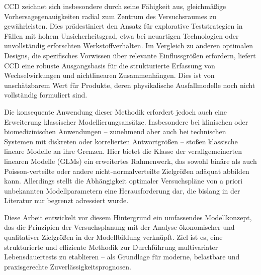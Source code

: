CCD zeichnet sich insbesondere durch seine Fähigkeit aus, gleichmäßige Vorhersagegenauigkeiten radial zum Zentrum des Versuchsraumes zu gewährleisten. Dies prädestiniert den Ansatz für explorative Teststrategien in Fällen mit hohem Unsicherheitsgrad, etwa bei neuartigen Technologien oder unvollständig erforschten Werkstoffverhalten. Im Vergleich zu anderen optimalen Designs, die spezifisches Vorwissen über relevante Einflussgrößen erfordern, liefert CCD eine robuste Ausgangsbasis für die strukturierte Erfassung von Wechselwirkungen und nichtlinearen Zusammenhängen. Dies ist von unschätzbarem Wert für Produkte, deren physikalische Ausfallmodelle noch nicht vollständig formuliert sind.

Die konsequente Anwendung dieser Methodik erfordert jedoch auch eine Erweiterung klassischer Modellierungsansätze. Insbesondere bei klinischen oder biomedizinischen Anwendungen – zunehmend aber auch bei technischen Systemen mit diskreten oder korrelierten Antwortgrößen – stoßen klassische lineare Modelle an ihre Grenzen. Hier bietet die Klasse der verallgemeinerten linearen Modelle (GLMs) ein erweitertes Rahmenwerk, das sowohl binäre als auch Poisson-verteilte oder andere nicht-normalverteilte Zielgrößen adäquat abbilden kann. Allerdings stellt die Abhängigkeit optimaler Versuchspläne von a priori unbekannten Modellparametern eine Herausforderung dar, die bislang in der Literatur nur begrenzt adressiert wurde.

Diese Arbeit entwickelt vor diesem Hintergrund ein umfassendes Modellkonzept, das die Prinzipien der Versuchsplanung mit der Analyse ökonomischer und qualitativer Zielgrößen in der Modellbildung verknüpft. Ziel ist es, eine strukturierte und effiziente Methodik zur Durchführung multivariater Lebensdauertests zu etablieren – als Grundlage für moderne, belastbare und praxisgerechte Zuverlässigkeitsprognosen.




